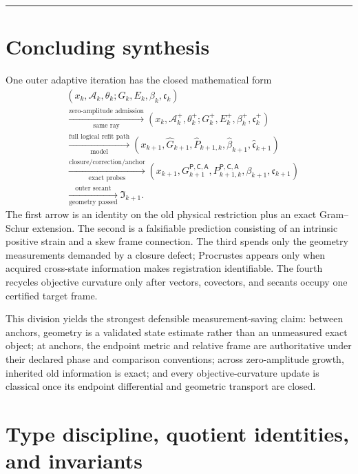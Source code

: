 \documentclass[10pt,twocolumn]{article}
\theoremstyle{definition}
\theoremstyle{remark}
\newcommand{\conceptbreak}{\par\vspace{0.45em}\noindent\textcolor{navy!55}{\rule{\columnwidth}{0.35pt}}\vspace{0.35em}\par}
\newcommand{\A}{\mathsf A}
\newcommand{\Prd}{\mathsf P}
\newcommand{\Cor}{\mathsf C}
\begin{document}
\conceptbreak

\section{Concluding synthesis}

One outer adaptive iteration has the closed mathematical form
\begin{align}
 &(x_k,\mathcal A_k,\theta_k;G_k,E_k,\beta_k,\mathfrak c_k)\nonumber\\
 &\xrightarrow[\text{same ray}]{\text{zero-amplitude admission}}
 (x_k,\mathcal A_k^+,\theta_k^+;G_k^+,E_k^+,\beta_k^+,\mathfrak c_k^+)\nonumber\\
 &\xrightarrow[\text{model}]{\text{full logical refit path}}
 (x_{k+1},\widehat G_{k+1},\widehat P_{k+1,k},
 \widehat\beta_{k+1},\widehat{\mathfrak c}_{k+1})\nonumber\\
 &\xrightarrow[\text{exact probes}]{\text{closure/correction/anchor}}
 (x_{k+1},G_{k+1}^{\Prd,\Cor,\A},P_{k+1,k}^{\Prd,\Cor,\A},
 \beta_{k+1},\mathfrak c_{k+1})\nonumber\\
 &\xrightarrow[\text{geometry passed}]{\text{outer secant}}
 \mathfrak I_{k+1}.
 \label{eq:finalchain}
\end{align}
The first arrow is an identity on the old physical restriction plus an exact Gram--Schur extension.  The second is a falsifiable prediction consisting of an intrinsic positive strain and a skew frame connection.  The third spends only the geometry measurements demanded by a closure defect; Procrustes appears only when acquired cross-state information makes registration identifiable.  The fourth recycles objective curvature only after vectors, covectors, and secants occupy one certified target frame.

This division yields the strongest defensible measurement-saving claim: between anchors, geometry is a validated state estimate rather than an unmeasured exact object; at anchors, the endpoint metric and relative frame are authoritative under their declared phase and comparison conventions; across zero-amplitude growth, inherited old information is exact; and every objective-curvature update is classical once its endpoint differential and geometric transport are closed.

\appendix

\section{Type discipline, quotient identities, and invariants}
\label{app:types}
\end{document}
